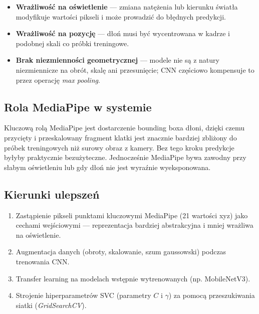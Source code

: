 \begin{itemize}
    \item \textbf{Wrażliwość na oświetlenie} --- zmiana natężenia lub kierunku
          światła modyfikuje wartości pikseli i może prowadzić do błędnych
          predykcji.
    \item \textbf{Wrażliwość na pozycję} --- dłoń musi być wycentrowana w kadrze
          i podobnej skali co próbki treningowe.
    \item \textbf{Brak niezmienności geometrycznej} --- modele nie są z natury
          niezmiennicze na obrót, skalę ani przesunięcie; CNN częściowo
          kompensuje to przez operację \textit{max pooling}.
\end{itemize}

\subsection{Rola MediaPipe w systemie}

Kluczową rolą MediaPipe jest dostarczenie bounding boxa dłoni, dzięki czemu
przycięty i przeskalowany fragment klatki jest znacznie bardziej zbliżony
do próbek treningowych niż surowy obraz z kamery. Bez tego kroku predykcje
byłyby praktycznie bezużyteczne. Jednocześnie MediaPipe bywa zawodny
przy słabym oświetleniu lub gdy dłoń nie jest wyraźnie wyeksponowana.

\subsection{Kierunki ulepszeń}

\begin{enumerate}
    \item Zastąpienie pikseli punktami kluczowymi MediaPipe (21 wartości xyz)
          jako cechami wejściowymi --- reprezentacja bardziej abstrakcyjna
          i mniej wrażliwa na oświetlenie.
    \item Augmentacja danych (obroty, skalowanie, szum gaussowski) podczas
          trenowania CNN.
    \item Transfer learning na modelach wstępnie wytrenowanych (np. MobileNetV3).
    \item Strojenie hiperparametrów SVC (parametry $C$ i $\gamma$) za pomocą
          przeszukiwania siatki (\textit{GridSearchCV}).
\end{enumerate}